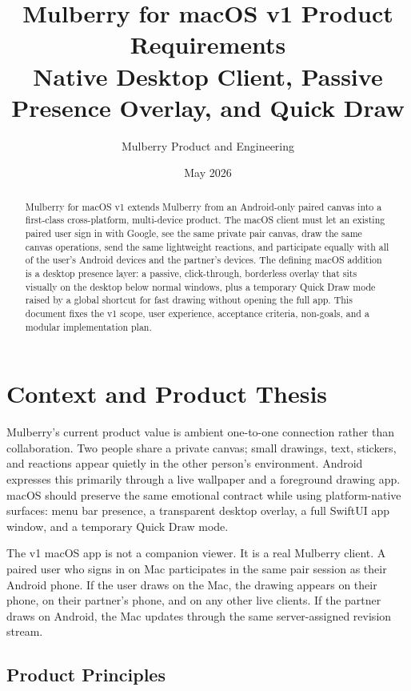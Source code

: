 \documentclass[11pt]{article}
\title{\textbf{Mulberry for macOS v1 Product Requirements}\\
\large Native Desktop Client, Passive Presence Overlay, and Quick Draw}
\author{Mulberry Product and Engineering}
\date{May 2026}
\begin{document}
\maketitle

\begin{abstract}
Mulberry for macOS v1 extends Mulberry from an Android-only paired canvas into a first-class cross-platform, multi-device product. The macOS client must let an existing paired user sign in with Google, see the same private pair canvas, draw the same canvas operations, send the same lightweight reactions, and participate equally with all of the user's Android devices and the partner's devices. The defining macOS addition is a desktop presence layer: a passive, click-through, borderless overlay that sits visually on the desktop below normal windows, plus a temporary Quick Draw mode raised by a global shortcut for fast drawing without opening the full app. This document fixes the v1 scope, user experience, acceptance criteria, non-goals, and a modular implementation plan.
\end{abstract}

\section{Context and Product Thesis}

Mulberry's current product value is ambient one-to-one connection rather than collaboration. Two people share a private canvas; small drawings, text, stickers, and reactions appear quietly in the other person's environment. Android expresses this primarily through a live wallpaper and a foreground drawing app. macOS should preserve the same emotional contract while using platform-native surfaces: menu bar presence, a transparent desktop overlay, a full SwiftUI app window, and a temporary Quick Draw mode.

The v1 macOS app is not a companion viewer. It is a real Mulberry client. A paired user who signs in on Mac participates in the same pair session as their Android phone. If the user draws on the Mac, the drawing appears on their phone, on their partner's phone, and on any other live clients. If the partner draws on Android, the Mac updates through the same server-assigned revision stream.

\subsection{Product Principles}
\end{document}
